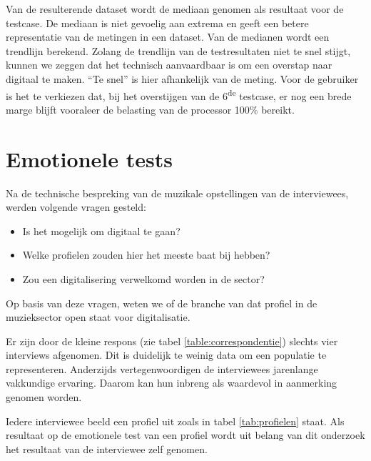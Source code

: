 Van de resulterende dataset wordt de mediaan genomen als resultaat voor de testcase. De mediaan is niet gevoelig aan extrema en geeft een betere representatie van de metingen in een dataset. \autocite{median} Van de medianen wordt een trendlijn berekend. Zolang de trendlijn van de testresultaten niet te snel stijgt, kunnen we zeggen dat het technisch aanvaardbaar is om een overstap naar digitaal te maken. ``Te snel'' is hier afhankelijk van de meting. Voor de gebruiker is het te verkiezen dat, bij het overstijgen van de 6\textsuperscript{de} testcase, er nog een brede marge blijft vooraleer de belasting van de processor 100\% bereikt.

\section{Emotionele tests}
\label{sec:methodologie:emotioneletests}

Na de technische bespreking van de muzikale opstellingen van de interviewees, werden volgende vragen gesteld:

\begin{itemize}
	\item Is het mogelijk om digitaal te gaan?
	\item Welke profielen zouden hier het meeste baat bij hebben?
	\item Zou een digitalisering verwelkomd worden in de sector?
\end{itemize}

Op basis van deze vragen, weten we of de branche van dat profiel in de muzieksector open staat voor digitalisatie.

Er zijn door de kleine respons (zie tabel \ref{table:correspondentie}) slechts vier interviews afgenomen. Dit is duidelijk te weinig data om een populatie te representeren. Anderzijds vertegenwoordigen de interviewees jarenlange vakkundige ervaring. Daarom kan hun inbreng als waardevol in aanmerking genomen worden. 

Iedere interviewee beeld een profiel uit zoals in tabel \ref{tab:profielen} staat. Als resultaat op de emotionele test van een profiel wordt uit belang van dit onderzoek het resultaat van de interviewee zelf genomen.

